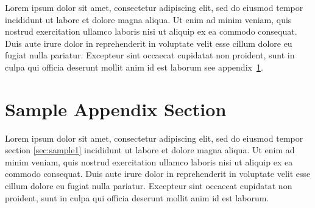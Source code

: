 \documentclass[preprint,12pt]{elsarticle}
\begin{document}
Lorem ipsum dolor sit amet, consectetur adipiscing elit, sed do eiusmod tempor incididunt ut labore et dolore magna aliqua. Ut enim ad minim veniam, quis nostrud exercitation ullamco laboris nisi ut aliquip ex ea commodo consequat. Duis aute irure dolor in reprehenderit in voluptate velit esse cillum dolore eu fugiat nulla pariatur. Excepteur sint occaecat cupidatat non proident, sunt in culpa qui officia deserunt mollit anim id est laborum see appendix~\ref{sec:sample:appendix}.

\appendix

\section{Sample Appendix Section}
\label{sec:sample:appendix}
Lorem ipsum dolor sit amet, consectetur adipiscing elit, sed do eiusmod tempor section \ref{sec:sample1} incididunt ut labore et dolore magna aliqua. Ut enim ad minim veniam, quis nostrud exercitation ullamco laboris nisi ut aliquip ex ea commodo consequat. Duis aute irure dolor in reprehenderit in voluptate velit esse cillum dolore eu fugiat nulla pariatur. Excepteur sint occaecat cupidatat non proident, sunt in culpa qui officia deserunt mollit anim id est laborum.

 






\end{document}
